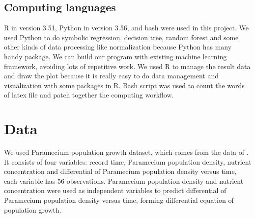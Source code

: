 \documentclass[11pt,a4paper]{article}
\begin{document}
\subsection{Computing languages}
R in version 3.51, Python in version 3.56, and bash were used in this project. We used Python to do symbolic regression, decision tree, random forest and some other kinds of data processing like normalization because Python has many handy package. We can build our program with existing machine learning framework, avoiding lots of repetitive work. We used R to manage the result data and draw the plot because it is really easy to do data management and visualization with some packages in R. Bash script was used to count the words of latex file and patch together the computing workflow.

\section{Data}
We used Paramecium population growth dataset, which comes from the data of \citet{BenjaminT.MartinStephanB.Munch2018}. It consists of four variables: record time, Paramecium population density, nutrient concentration and differential of Paramecium population density versus time, each variable has 56 observations. Paramecium population density and nutrient concentration were used as independent variables to predict differential of Paramecium population density versus time, forming differential equation of population growth.
\end{document}
